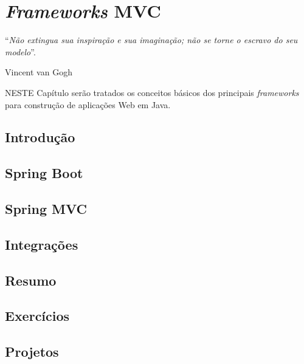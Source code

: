 \chapter{\textit{Frameworks} MVC}\label{cap:frameworksMVC}
\epigraph{``\textit{Não extingua sua inspiração e sua imaginação; não se torne o escravo do seu modelo}''.}{Vincent van Gogh}

\lettrine[lines=4, lhang=0.1, lraise=0, loversize=0.2, findent=0.1em]{\textcolor{corAzulTema}{N}}{ESTE} Capítulo serão tratados os conceitos básicos dos principais \textit{frameworks} para construção de aplicações Web em Java.

\section{Introdução}

\section{Spring Boot}

\section{Spring MVC}

\section{Integrações}

\section{Resumo}

\section{Exercícios}

\section{Projetos}
